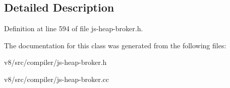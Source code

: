 \subsection{Detailed Description}


Definition at line 594 of file js-\/heap-\/broker.\+h.



The documentation for this class was generated from the following files\+:\begin{DoxyCompactItemize}
\item 
v8/src/compiler/js-\/heap-\/broker.\+h\item 
v8/src/compiler/js-\/heap-\/broker.\+cc\end{DoxyCompactItemize}
